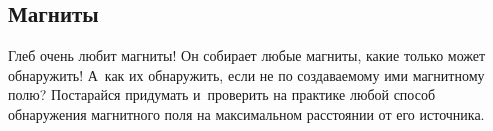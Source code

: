 \documentclass[a4paper,12pt]{article}
\begin{document}
\subsection{Магниты}
Глеб очень любит магниты! Он собирает любые магниты, какие только может обнаружить!
А~как их обнаружить, если не по создаваемому ими магнитному полю? Постарайся придумать
и~проверить на практике любой способ обнаружения магнитного поля
на максимальном расстоянии от его источника.

\end{document}
